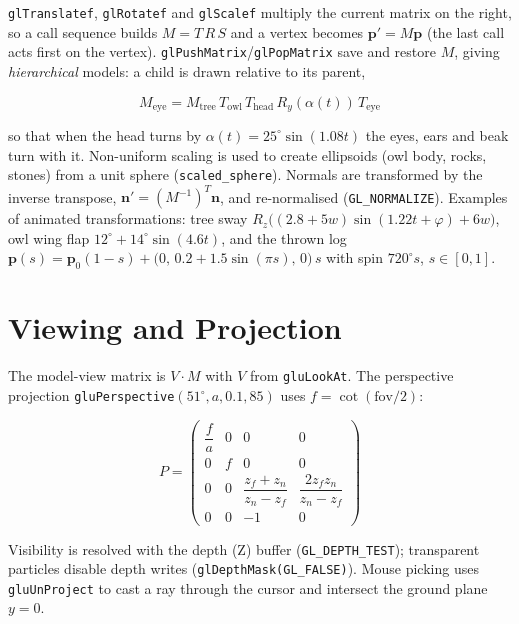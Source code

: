 \documentclass[12pt,a4paper]{report}
\begin{document}
\texttt{glTranslatef}, \texttt{glRotatef} and \texttt{glScalef} multiply the current matrix on the right, so a call sequence builds $M = T\,R\,S$ and a vertex becomes $\mathbf{p}'=M\mathbf{p}$ (the last call acts first on the vertex).
\texttt{glPushMatrix}/\texttt{glPopMatrix} save and restore $M$, giving \emph{hierarchical} models: a child is drawn relative to its parent,

\begin{equation}
M_{\text{eye}} = M_{\text{tree}}\,T_{\text{owl}}\,T_{\text{head}}\,R_y(\alpha(t))\,T_{\text{eye}}
\label{eq:hier}
\end{equation}

so that when the head turns by $\alpha(t)=25^\circ\sin(1.08t)$ the eyes, ears and beak turn with it.
Non-uniform scaling is used to create ellipsoids (owl body, rocks, stones) from a unit sphere (\texttt{scaled\_sphere}).
Normals are transformed by the inverse transpose, $\mathbf{n}'=(M^{-1})^T\mathbf{n}$, and re-normalised (\texttt{GL\_NORMALIZE}).
Examples of animated transformations: tree sway $R_z\bigl((2.8+5w)\sin(1.22t+\varphi)+6w\bigr)$, owl wing flap $12^\circ+14^\circ\sin(4.6t)$, and the thrown log
$\mathbf{p}(s)=\mathbf{p}_0(1-s)+\bigl(0,\,0.2+1.5\sin(\pi s),\,0\bigr)\,s$ with spin $720^\circ s$, $s\in[0,1]$.

\section{Viewing and Projection}

The model-view matrix is $V\cdot M$ with $V$ from \texttt{gluLookAt}.
The perspective projection \texttt{gluPerspective}$(51^\circ,a,0.1,85)$ uses $f=\cot(\mathrm{fov}/2)$:

\begin{equation}
P=\begin{pmatrix}\dfrac{f}{a}&0&0&0\\0&f&0&0\\0&0&\dfrac{z_f+z_n}{z_n-z_f}&\dfrac{2z_fz_n}{z_n-z_f}\\0&0&-1&0\end{pmatrix}
\label{eq:proj}
\end{equation}

Visibility is resolved with the depth (Z) buffer (\texttt{GL\_DEPTH\_TEST}); transparent particles disable depth writes (\texttt{glDepthMask(GL\_FALSE)}).
Mouse picking uses \texttt{gluUnProject} to cast a ray through the cursor and intersect the ground plane $y=0$.
\end{document}
